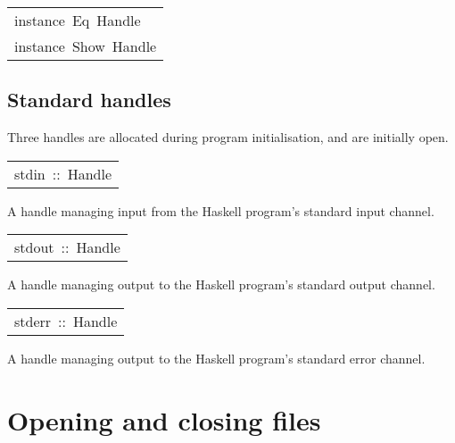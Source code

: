\begin{haddockdesc}
\end{haddockdesc}
\begin{haddockdesc}
\item[\begin{tabular}{@{}l}
instance\ Eq\ Handle\\instance\ Show\ Handle\\
\end{tabular}]
\end{haddockdesc}
\subsection{Standard handles
}
Three handles are allocated during program initialisation,
 and are initially open.
\par

\begin{haddockdesc}
\item[\begin{tabular}{@{}l}
stdin\ ::\ Handle
\end{tabular}]\haddockbegindoc
A handle managing input from the Haskell program's standard input channel.
\par

\end{haddockdesc}
\begin{haddockdesc}
\item[\begin{tabular}{@{}l}
stdout\ ::\ Handle
\end{tabular}]\haddockbegindoc
A handle managing output to the Haskell program's standard output channel.
\par

\end{haddockdesc}
\begin{haddockdesc}
\item[\begin{tabular}{@{}l}
stderr\ ::\ Handle
\end{tabular}]\haddockbegindoc
A handle managing output to the Haskell program's standard error channel.
\par

\end{haddockdesc}
\section{Opening and closing files
}
